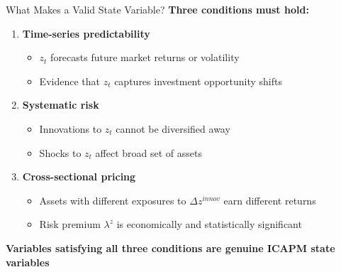 \documentclass{beamer}
\begin{document}
\begin{frame}{What Makes a Valid State Variable?}
\textbf{Three conditions must hold:}

\begin{enumerate}
\item \textbf{Time-series predictability}
\begin{itemize}
\item $z_t$ forecasts future market returns or volatility
\item Evidence that $z_t$ captures investment opportunity shifts
\end{itemize}
\vspace{0.2cm}

\item \textbf{Systematic risk}
\begin{itemize}
\item Innovations to $z_t$ cannot be diversified away
\item Shocks to $z_t$ affect broad set of assets
\end{itemize}
\vspace{0.2cm}

\item \textbf{Cross-sectional pricing}
\begin{itemize}
\item Assets with different exposures to $\Delta z^{innov}$ earn different returns
\item Risk premium $\lambda^z$ is economically and statistically significant
\end{itemize}
\end{enumerate}

\vspace{0.3cm}
\textbf{Variables satisfying all three conditions are genuine ICAPM state variables}
\end{frame}
\end{document}
